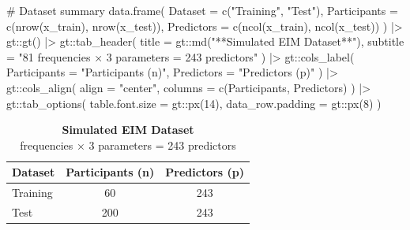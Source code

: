 \documentclass[
  letterpaper,
  DIV=11,
  numbers=noendperiod]{scrreprt}
\newenvironment{Shaded}{\begin{snugshade}}{\end{snugshade}}
\newcommand{\AttributeTok}[1]{\textcolor[rgb]{0.40,0.45,0.13}{#1}}
\newcommand{\CommentTok}[1]{\textcolor[rgb]{0.37,0.37,0.37}{#1}}
\newcommand{\DecValTok}[1]{\textcolor[rgb]{0.68,0.00,0.00}{#1}}
\newcommand{\FunctionTok}[1]{\textcolor[rgb]{0.28,0.35,0.67}{#1}}
\newcommand{\NormalTok}[1]{\textcolor[rgb]{0.00,0.23,0.31}{#1}}
\newcommand{\SpecialCharTok}[1]{\textcolor[rgb]{0.37,0.37,0.37}{#1}}
\newcommand{\StringTok}[1]{\textcolor[rgb]{0.13,0.47,0.30}{#1}}
\begin{document}
\begin{Shaded}
\begin{Highlighting}[]
\CommentTok{\# Dataset summary}
\FunctionTok{data.frame}\NormalTok{(}
  \AttributeTok{Dataset =} \FunctionTok{c}\NormalTok{(}\StringTok{"Training"}\NormalTok{, }\StringTok{"Test"}\NormalTok{),}
  \AttributeTok{Participants =} \FunctionTok{c}\NormalTok{(}\FunctionTok{nrow}\NormalTok{(x\_train), }\FunctionTok{nrow}\NormalTok{(x\_test)),}
  \AttributeTok{Predictors =} \FunctionTok{c}\NormalTok{(}\FunctionTok{ncol}\NormalTok{(x\_train), }\FunctionTok{ncol}\NormalTok{(x\_test))}
\NormalTok{) }\SpecialCharTok{|\textgreater{}}
\NormalTok{  gt}\SpecialCharTok{::}\FunctionTok{gt}\NormalTok{() }\SpecialCharTok{|\textgreater{}}
\NormalTok{  gt}\SpecialCharTok{::}\FunctionTok{tab\_header}\NormalTok{(}
    \AttributeTok{title =}\NormalTok{ gt}\SpecialCharTok{::}\FunctionTok{md}\NormalTok{(}\StringTok{"**Simulated EIM Dataset**"}\NormalTok{),}
    \AttributeTok{subtitle =} \StringTok{"81 frequencies × 3 parameters = 243 predictors"}
\NormalTok{  ) }\SpecialCharTok{|\textgreater{}}
\NormalTok{  gt}\SpecialCharTok{::}\FunctionTok{cols\_label}\NormalTok{(}
    \AttributeTok{Participants =} \StringTok{"Participants (n)"}\NormalTok{,}
    \AttributeTok{Predictors =} \StringTok{"Predictors (p)"}
\NormalTok{  ) }\SpecialCharTok{|\textgreater{}}
\NormalTok{  gt}\SpecialCharTok{::}\FunctionTok{cols\_align}\NormalTok{(}
    \AttributeTok{align =} \StringTok{"center"}\NormalTok{,}
    \AttributeTok{columns =} \FunctionTok{c}\NormalTok{(Participants, Predictors)}
\NormalTok{  ) }\SpecialCharTok{|\textgreater{}}
\NormalTok{  gt}\SpecialCharTok{::}\FunctionTok{tab\_options}\NormalTok{(}
    \AttributeTok{table.font.size =}\NormalTok{ gt}\SpecialCharTok{::}\FunctionTok{px}\NormalTok{(}\DecValTok{14}\NormalTok{),}
    \AttributeTok{data\_row.padding =}\NormalTok{ gt}\SpecialCharTok{::}\FunctionTok{px}\NormalTok{(}\DecValTok{8}\NormalTok{)}
\NormalTok{  )}
\end{Highlighting}
\end{Shaded}

\begin{table}
\caption*{
{\fontsize{20}{25}\selectfont  \textbf{Simulated EIM Dataset}\fontsize{10}{13}\selectfont } \\ 
{\fontsize{14}{17} frequencies × 3 parameters = 243 predictors\fontsize{10}{13}\selectfont }
} 
\fontsize{10.0pt}{13.0pt}\selectfont
\begin{tabular*}{\linewidth}{@{\extracolsep{\fill}}lcc}
\toprule
Dataset & Participants (n) & Predictors (p) \\ 
\midrule\addlinespace[2.5pt]
Training & 60 & 243 \\ 
Test & 200 & 243 \\ 
\bottomrule
\end{tabular*}
\end{table}
\end{document}
